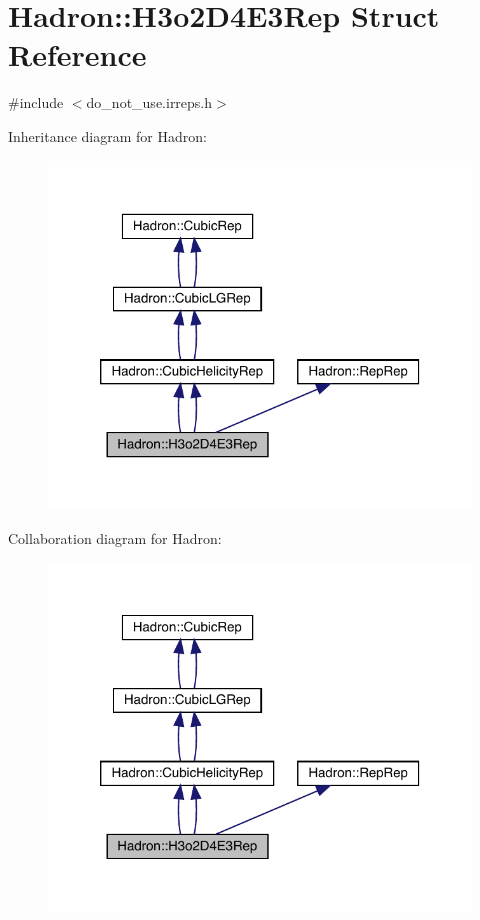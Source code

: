 \hypertarget{structHadron_1_1H3o2D4E3Rep}{}\section{Hadron\+:\+:H3o2\+D4\+E3\+Rep Struct Reference}
\label{structHadron_1_1H3o2D4E3Rep}


{\ttfamily \#include $<$do\+\_\+not\+\_\+use.\+irreps.\+h$>$}



Inheritance diagram for Hadron\+:\nopagebreak
\begin{figure}[H]
\begin{center}
\leavevmode
\includegraphics[width=320pt]{d1/d22/structHadron_1_1H3o2D4E3Rep__inherit__graph}
\end{center}
\end{figure}


Collaboration diagram for Hadron\+:\nopagebreak
\begin{figure}[H]
\begin{center}
\leavevmode
\includegraphics[width=320pt]{d6/dae/structHadron_1_1H3o2D4E3Rep__coll__graph}
\end{center}
\end{figure}
